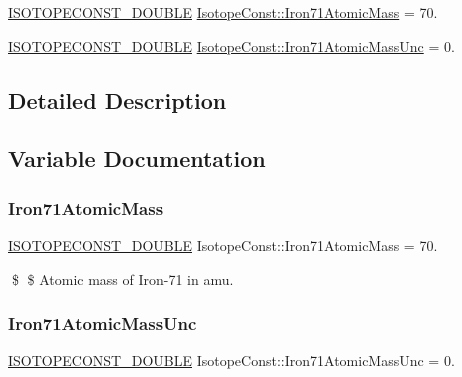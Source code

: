 \begin{DoxyCompactItemize}
\item 
\mbox{\hyperlink{group___isotope_const-_macros_ga8f45a7272ce02c0b4c65c44636ed719a}{I\+S\+O\+T\+O\+P\+E\+C\+O\+N\+S\+T\+\_\+\+D\+O\+U\+B\+LE}} \mbox{\hyperlink{group___isotope_const-_iron-_fe71_ga462a4cc0b1f17cdab7e733f89cb55c99}{Isotope\+Const\+::\+Iron71\+Atomic\+Mass}} = 70.
\item 
\mbox{\hyperlink{group___isotope_const-_macros_ga8f45a7272ce02c0b4c65c44636ed719a}{I\+S\+O\+T\+O\+P\+E\+C\+O\+N\+S\+T\+\_\+\+D\+O\+U\+B\+LE}} \mbox{\hyperlink{group___isotope_const-_iron-_fe71_ga538c50f3e09dc469820f8e9ef079a955}{Isotope\+Const\+::\+Iron71\+Atomic\+Mass\+Unc}} = 0.
\end{DoxyCompactItemize}


\subsection{Detailed Description}


\subsection{Variable Documentation}
\mbox{\label{group___isotope_const-_iron-_fe71_ga462a4cc0b1f17cdab7e733f89cb55c99}} 
\subsubsection{\texorpdfstring{Iron71\+Atomic\+Mass}{Iron71AtomicMass}}
{\footnotesize\ttfamily \mbox{\hyperlink{group___isotope_const-_macros_ga8f45a7272ce02c0b4c65c44636ed719a}{I\+S\+O\+T\+O\+P\+E\+C\+O\+N\+S\+T\+\_\+\+D\+O\+U\+B\+LE}} Isotope\+Const\+::\+Iron71\+Atomic\+Mass = 70.}

\$ \$ Atomic mass of Iron-\/71 in amu. \mbox{\label{group___isotope_const-_iron-_fe71_ga538c50f3e09dc469820f8e9ef079a955}} 
\subsubsection{\texorpdfstring{Iron71\+Atomic\+Mass\+Unc}{Iron71AtomicMassUnc}}
{\footnotesize\ttfamily \mbox{\hyperlink{group___isotope_const-_macros_ga8f45a7272ce02c0b4c65c44636ed719a}{I\+S\+O\+T\+O\+P\+E\+C\+O\+N\+S\+T\+\_\+\+D\+O\+U\+B\+LE}} Isotope\+Const\+::\+Iron71\+Atomic\+Mass\+Unc = 0.}

